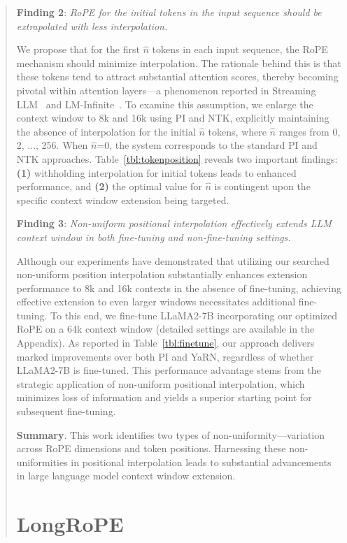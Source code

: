 \begin{abstract}
\textbf{Finding 2}: \textit{RoPE for the initial tokens in the input sequence should be extrapolated with less interpolation.} 

We propose that for the first $\hat{n}$ tokens in each input sequence, the RoPE mechanism should minimize interpolation. The rationale behind this is that these tokens tend to attract substantial attention scores, thereby becoming pivotal within attention layers—a phenomenon reported in Streaming LLM~\cite{streamingllm} and LM-Infinite~\cite{han2023lminfinite}. To examine this assumption, we enlarge the context window to 8k and 16k using PI and NTK, explicitly maintaining the absence of interpolation for the initial $\hat n$ tokens, where $\hat n$ ranges from 0, 2, ..., 256. When $\hat n$=0, the system corresponds to the standard PI and NTK approaches. Table~\ref{tbl:tokenposition} reveals two important findings: \textbf{(1)} withholding interpolation for initial tokens leads to enhanced performance, and \textbf{(2)} the optimal value for $\hat n$ is contingent upon the specific context window extension being targeted.

\textbf{Finding 3}: \textit{Non-uniform positional interpolation effectively extends LLM context window in both fine-tuning and non-fine-tuning settings.} 

Although our experiments have demonstrated that utilizing our searched non-uniform position interpolation substantially enhances extension performance to 8k and 16k contexts in the absence of fine-tuning, achieving effective extension to even larger windows necessitates additional fine-tuning. To this end, we fine-tune LLaMA2-7B incorporating our optimized RoPE on a 64k context window (detailed settings are available in the Appendix). As reported in Table~\ref{tbl:finetune}, our approach delivers marked improvements over both PI and YaRN, regardless of whether LLaMA2-7B is fine-tuned. This performance advantage stems from the strategic application of non-uniform positional interpolation, which minimizes loss of information and yields a superior starting point for subsequent fine-tuning.

\textbf{Summary}. This work identifies two types of non-uniformity—variation across RoPE dimensions and token positions. Harnessing these non-uniformities in positional interpolation leads to substantial advancements in large language model context window extension.

\section{LongRoPE}


\end{abstract}
